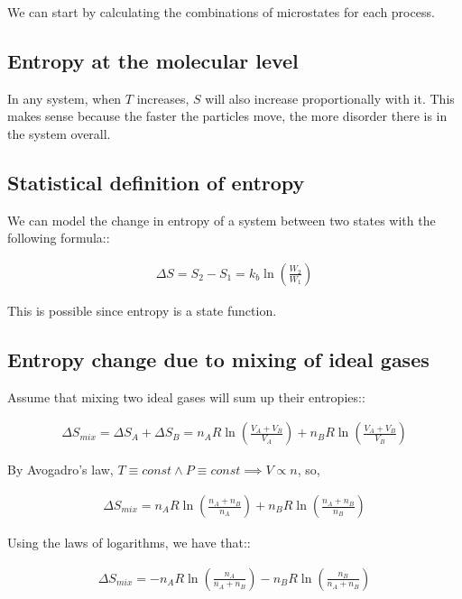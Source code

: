 \documentclass[12pt]{book}
\begin{document}
We can start by calculating the combinations of microstates for each process. %

\subsection*{Entropy at the molecular level}

In any system, when $T$ increases, $S$ will also increase proportionally with it. This makes sense because the faster the particles move, the more disorder there is in the system overall.

\subsection*{Statistical definition of entropy}

We can model the change in entropy of a system between two states with the following formula::

\begin{align*}
    \Delta S=S_2-S_1=k_b\ln(\frac{W_2}{W_1})
\end{align*}

This is possible since entropy is a state function.

\subsection*{Entropy change due to mixing of ideal gases}

Assume that mixing two ideal gases will sum up their entropies::

\begin{align*}
    \Delta S_{mix}=\Delta S_A + \Delta S_B=n_A R\ln\left(\frac{V_A+V_B}{V_A}\right)+ n_B R\ln\left(\frac{V_A+V_B}{V_B}\right)
\end{align*}

By Avogadro's law, $T\equiv const \land P\equiv const\implies V \propto n$, so,

\begin{align*}
    \Delta S_{mix}=n_A R\ln\left(\frac{n_A+n_B}{n_A}\right)+n_B R\ln\left(\frac{n_A+n_B}{n_B}\right)
\end{align*}

Using the laws of logarithms, we have that::

\begin{align*}
    \Delta S_{mix}=-n_A R\ln\left(\frac{n_A}{n_A+n_B}\right)-n_B R\ln\left(\frac{n_B}{n_A+n_B}\right)
\end{align*}
\end{document}
